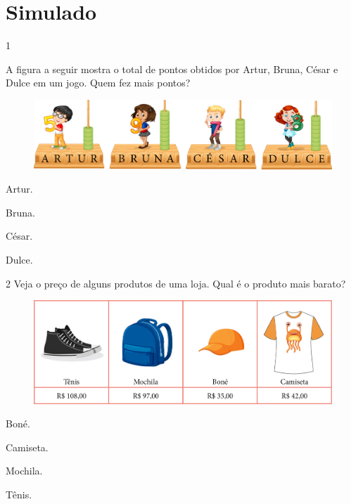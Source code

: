 \chapter[Simulado 2]{Simulado}

\num{1}

A figura a seguir mostra o total de pontos obtidos por Artur, Bruna, César
e Dulce em um jogo. Quem fez mais pontos?

\begin{figure}[H]
\includegraphics[width=\textwidth]{./media/image124.png}
\end{figure}

\begin{escolha}[itemsep=-5pt]
\begin{multicols}{4}
\item Artur.

\item Bruna.

\item César.

\item Dulce.
\end{multicols}
\end{escolha}

\num{2} Veja o preço de alguns produtos de uma loja. Qual é o produto mais
barato?

\begin{figure}[H]
\includegraphics[width=\textwidth]{./media/image125.png}
\end{figure}

\begin{escolha}[itemsep=-5pt]
\begin{multicols}{2}
\item Boné.

\item Camiseta.

\item Mochila.

\item Tênis.
\end{multicols}
\end{escolha}

